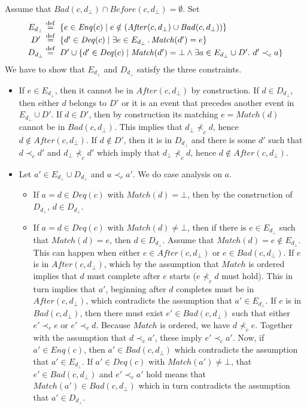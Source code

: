 \documentclass{LMCS}
\newcommand{\defeq}{\;\stackrel{\rm def}{=}\;}
\newcommand{\Match}{\ensuremath{\mathit{Match}}}
\newcommand{\Deq}[1]{\ensuremath{\mathit{Deq}({#1})}}
\newcommand{\Enq}[1]{\ensuremath{\mathit{Enq}({#1})}}
\newcommand{\Before}[2]{\ensuremath{\mathit{Before}({#1},{#2})}}
\newcommand{\After}[2]{\ensuremath{\mathit{After}({#1},{#2})}}
\newcommand{\Bad}[2]{\ensuremath{\mathit{Bad}(#1,#2)}}
\newcommand{\dhat}{\ensuremath{d_{\bot}}}
\newcommand{\Dhat}{\ensuremath{D_{\dhat}}}
\newcommand{\Ehat}{\ensuremath{E_{\dhat}}}
\begin{document}
\noindent {\bf ($\Rightarrow$)}
Assume that $\Bad c \dhat\cap \Before c \dhat= \emptyset$. Set
\[
\begin{array}{c@{}l}
\Ehat & \defeq \{ e\in \Enq c \mid e\notin(\After c \dhat\cup \Bad c \dhat)\}  \\
D'    & \defeq \{ d'\in \Deq c \mid \exists e\in \Ehat\,.\,\Match(d')=e\}  \\
\Dhat & \defeq D' \cup \{ d' \in \Deq c \mid \Match(d') = \bot \land \exists a\in \Ehat\cup D'.\  d'\prec_c a \} \\
\end{array}
\]
We have to show that $\Ehat$ and $\Dhat$ satisfy the three constraints.
\begin{itemize}
\item If $e\in \Ehat$, then it cannot be in $\After c \dhat$ by construction.
If $d\in \Dhat$, then either $d$ belongs to $D'$ or it is an event that precedes another event in $\Ehat\cup D'$.
If $d\in D'$, then by construction its matching $e=\Match(d)$ cannot be in $\Bad c \dhat$.
This implies that $\dhat\not\prec_c d$, hence $d\notin \After c \dhat$.
If $d\notin D'$, then it is in $\Dhat$ and there is some $d'$ such that $d\prec_c d'$ and $\dhat\not\prec_c d'$ which imply that $\dhat\not\prec_c d$, hence $d\notin \After c \dhat$.
\item Let $a'\in \Ehat\cup \Dhat$ and $a\prec_c a'$.
We do case analysis on $a$.
\begin{itemize}
\item If $a=d\in \Deq c$ with $\Match(d)=\bot$, then by the construction of $\Dhat$, $d\in \Dhat$.
\item If $a=d\in \Deq c$ with $\Match(d)\neq\bot$, then if there is $e\in \Ehat$ such that $\Match(d)=e$, then $d\in \Dhat$.
Assume that $\Match(d)=e\notin \Ehat$.
This can happen when either $e\in \After c \dhat$ or $e\in \Bad c \dhat$. 
If $e$ is in $\After c \dhat$, which by the assumption that $\Match$ is ordered implies that $d$ must complete after $e$ starts ($e\not\prec_c d$ must hold).
This in turn implies that $a'$, beginning after $d$ completes must be in $\After c {\dhat}$, which contradicts the assumption that $a'\in \Ehat$.
If $e$ is in $\Bad c \dhat$, then there must exist $e'\in\Bad c \dhat$ such that either $e'\prec_c e$ or $e'\prec_c d$.
Because $\Match$ is ordered, we have $d\not\prec_c e$.
Together with the assumption that $d\prec_c a'$, these imply $e'\prec_c a'$. 
Now, if $a'\in \Enq c$, then $a'\in \Bad c \dhat$ which contradicts the assumption that $a'\in \Ehat$.
If $a'\in \Deq c$ with $\Match(a')\neq\bot$, that $e'\in \Bad c \dhat$ and $e'\prec_c a'$ hold means that $\Match(a')\in \Bad c \dhat$ which in turn contradicts the assumption that $a'\in \Dhat$.

\end{itemize}
\end{itemize}
\end{document}
